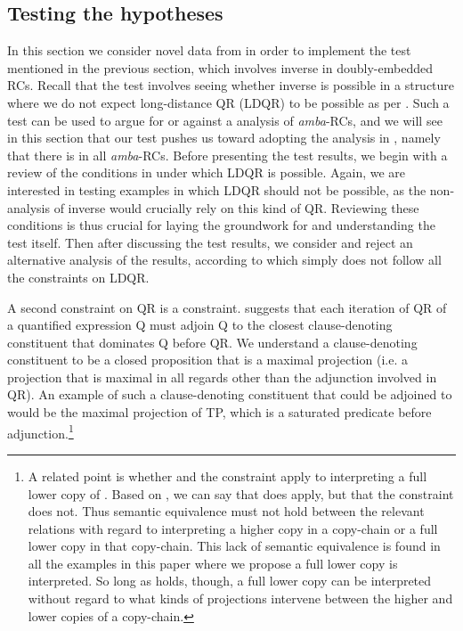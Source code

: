 \documentclass[output=paper,modfonts,nonflat,
colorlinks, citecolor=brown,
]{langsci/langscibook}
\begin{document}
\subsection{Testing the hypotheses}\label{sec:gould:4.2}
\largerpage[-3]
In this section we consider novel data from  in order to implement the test mentioned in the previous section, which involves inverse  in doubly-embedded RCs. Recall that the test involves seeing whether inverse  is possible in a structure where we do not expect long-distance QR (LDQR) to be possible as per \citet{Fox2000}. Such a test can be used to argue for or against a  analysis of \textit{amba}{}-RCs, and we will see in this section that our test pushes us toward adopting the analysis in , namely that there is  in all \textit{amba}{}-RCs. Before presenting the test results, we begin with a review of the conditions in \citet{Fox2000} under which LDQR is possible. Again, we are interested in testing examples in which LDQR should not be possible, as the non- analysis of inverse  would crucially rely on this kind of QR. Reviewing these conditions is thus crucial for laying the groundwork for and understanding the test itself. Then after discussing the test results, we consider and reject an alternative analysis of the results, according to which  simply does not follow all the constraints on LDQR.


A second constraint on QR is a  constraint. \citet[23, 63]{Fox2000} suggests that each iteration of QR of a quantified expression Q must adjoin Q to the closest clause-denoting constituent that dominates Q before QR. We understand a clause-denoting constituent to be a closed proposition that is a maximal projection (i.e. a projection that is maximal in all regards other than the adjunction involved in QR). An example of such a clause-denoting constituent that could be adjoined to would be the maximal projection of TP, which is a saturated predicate before adjunction.\footnote{A related point is whether  and the  constraint apply to interpreting a full lower copy of . Based on \citet[p. 23; n. 6, p. 23]{Fox2000}, we can say that  does apply, but that the  constraint does not. Thus semantic equivalence must not hold between the relevant  relations with regard to interpreting a higher copy in a copy-chain or a full lower copy in that copy-chain. This lack of semantic equivalence is found in all the examples in this paper where we propose a full lower copy is interpreted. So long as  holds, though, a full lower copy can be interpreted without regard to what kinds of projections intervene between the higher and lower copies of a copy-chain.\label{fnlabel}}
\end{document}
